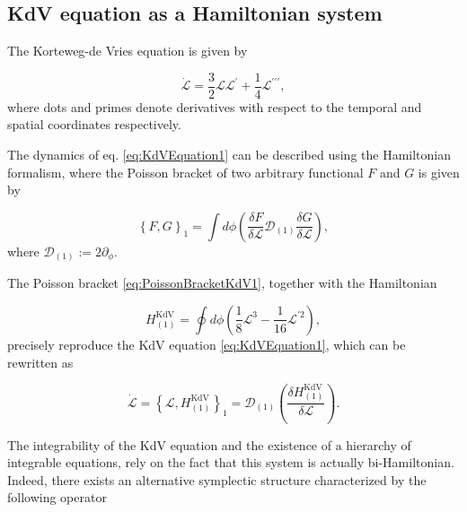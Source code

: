 \documentclass[letterpaper,11pt,oneside]{book}
\begin{document}
\subsection{KdV equation as a Hamiltonian system}

The Korteweg-de Vries equation is given by

\begin{equation}
	\dot{\mathcal{L}}=\frac{3}{2}\mathcal{L}\mathcal{L^{\prime}}+\frac{1}{4}\mathcal{L^{\prime\prime\prime}},\label{eq:KdVEquation1}
\end{equation}
where dots and primes denote derivatives with respect to the temporal
and spatial coordinates respectively.

The dynamics of eq. \eqref{eq:KdVEquation1} can be described
using the Hamiltonian formalism, where the Poisson bracket of two
arbitrary functional $F$ and $G$ is given by

\begin{equation}
	\left\{ F,G\right\} _{1}=\int d\phi\left(\frac{\delta F}{\delta\mathcal{L}}\mathcal{D}_{\left(1\right)}\frac{\delta G}{\delta\mathcal{L}}\right),\label{eq:PoissonBracketKdV1}
\end{equation}
where $\mathcal{D}_{\left(1\right)}:=2\partial_{\phi}$. 

The Poisson bracket \eqref{eq:PoissonBracketKdV1}, together with the Hamiltonian

\begin{equation}
	H_{\left(1\right)}^{\text{KdV}}=\oint d\phi\left(\frac{1}{8}\mathcal{L}^{3}-\frac{1}{16}\mathcal{L}^{\prime2}\right),\label{eq:HKdV1}
\end{equation}
precisely reproduce the KdV equation \eqref{eq:KdVEquation1}, which can be rewritten as

\begin{equation}
	\dot{\mathcal{L}}=\left\{ \mathcal{L},H_{\left(1\right)}^{\text{KdV}}\right\} _{1}=\mathcal{D}_{\left(1\right)}\left(\frac{\delta H_{\left(1\right)}^{\text{KdV}}}{\delta\mathcal{L}}\right).\label{eq:KdVEq1}
\end{equation}

The integrability of the KdV equation and the existence of
a hierarchy of integrable equations, rely on the fact that this system is actually
bi-Hamiltonian. Indeed, there exists an alternative symplectic structure
characterized by the following operator
\end{document}

